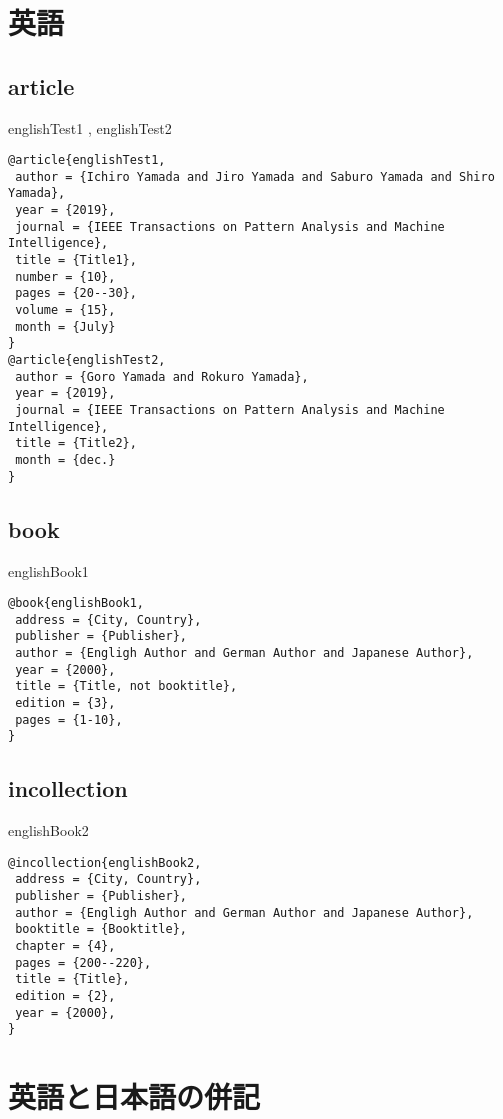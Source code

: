 \documentclass[10pt,a4paper]{article}
\begin{document}
\section{英語}
\subsection{article}

englishTest1 \cite{englishTest1}, 
englishTest2 \cite{englishTest2}

\begin{lstlisting}
@article{englishTest1,
 author = {Ichiro Yamada and Jiro Yamada and Saburo Yamada and Shiro Yamada},
 year = {2019},
 journal = {IEEE Transactions on Pattern Analysis and Machine Intelligence},
 title = {Title1},
 number = {10},
 pages = {20--30},
 volume = {15},
 month = {July}
}
@article{englishTest2,
 author = {Goro Yamada and Rokuro Yamada},
 year = {2019},
 journal = {IEEE Transactions on Pattern Analysis and Machine Intelligence},
 title = {Title2},
 month = {dec.}
}
\end{lstlisting}

\subsection{book}
englishBook1 \cite{englishBook1}

\begin{lstlisting}
@book{englishBook1,
 address = {City, Country},
 publisher = {Publisher},
 author = {Engligh Author and German Author and Japanese Author},
 year = {2000},
 title = {Title, not booktitle},
 edition = {3},
 pages = {1-10},
}
\end{lstlisting}

\subsection{incollection}
englishBook2 \cite{englishBook2}

\begin{lstlisting}
@incollection{englishBook2,
 address = {City, Country},
 publisher = {Publisher},
 author = {Engligh Author and German Author and Japanese Author},
 booktitle = {Booktitle},
 chapter = {4},
 pages = {200--220},
 title = {Title},
 edition = {2},
 year = {2000},
}
\end{lstlisting}

\section{英語と日本語の併記}
\end{document}
